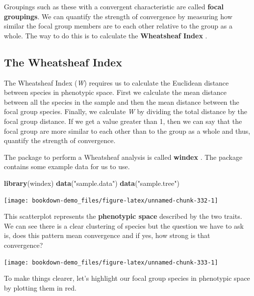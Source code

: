\documentclass[
]{book}
\newenvironment{Shaded}{\begin{snugshade}}{\end{snugshade}}
\newcommand{\KeywordTok}[1]{\textcolor[rgb]{0.13,0.29,0.53}{\textbf{#1}}}
\newcommand{\NormalTok}[1]{#1}
\newcommand{\StringTok}[1]{\textcolor[rgb]{0.31,0.60,0.02}{#1}}
\begin{document}
Groupings such as these with a convergent characteristic are called \textbf{focal groupings}. We can quantify the strength of convergence by measuring how similar the focal group members are to each other relative to the group as a whole. The way to do this is to calculate the \textbf{Wheatsheaf Index} \citep{Arbuckle14}.

\hypertarget{the-wheatsheaf-index}{%
\subsection{The Wheatsheaf Index}\label{the-wheatsheaf-index}}

The Wheatsheaf Index (\emph{W}) requires us to calculate the Euclidean distance between species in phenotypic space. First we calculate the mean distance between all the species in the sample and then the mean distance between the focal group species. Finally, we calculate \emph{W} by dividing the total distance by the focal group distance. If we get a value greater than 1, then we can say that the focal group are more similar to each other than to the group as a whole and thus, quantify the strength of convergence.

The package to perform a Wheatsheaf analysis is called \textbf{windex} \citep{windex}. The package contains some example data for us to use.

\begin{Shaded}
\begin{Highlighting}[]
\KeywordTok{library}\NormalTok{(windex)}
\KeywordTok{data}\NormalTok{(}\StringTok{"sample.data"}\NormalTok{)}
\KeywordTok{data}\NormalTok{(}\StringTok{"sample.tree"}\NormalTok{)}
\end{Highlighting}
\end{Shaded}

\begin{center}\texttt{[image: bookdown-demo\_files/figure-latex/unnamed-chunk-332-1]} \end{center}

This scatterplot represents the \textbf{phenotypic space} described by the two traits. We can see there is a clear clustering of species but the question we have to ask is, does this pattern mean convergence and if yes, how strong is that convergence?

\begin{center}\texttt{[image: bookdown-demo\_files/figure-latex/unnamed-chunk-333-1]} \end{center}

To make things clearer, let's highlight our focal group species in phenotypic space by plotting them in red.
\end{document}
